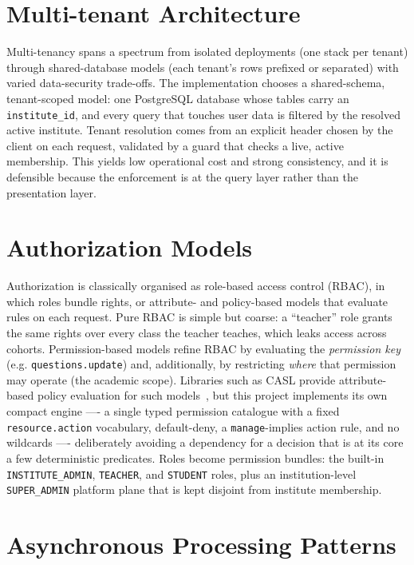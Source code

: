\section{Multi-tenant Architecture}

Multi-tenancy spans a spectrum from isolated deployments (one stack per
tenant) through shared-database models (each tenant's rows prefixed or
separated) with varied data-security trade-offs. The implementation chooses a
shared-schema, tenant-scoped model: one PostgreSQL database whose tables carry
an \texttt{institute\_id}, and every query that touches user data is filtered
by the resolved active institute. Tenant resolution comes from an explicit
header chosen by the client on each request, validated by a guard that checks
a live, active membership. This yields low operational cost and strong
consistency, and it is defensible because the enforcement is at the query
layer rather than the presentation layer.

\section{Authorization Models}

Authorization is classically organised as role-based access control (RBAC),
in which roles bundle rights, or attribute- and policy-based models that
evaluate rules on each request. Pure RBAC is simple but coarse: a ``teacher''
role grants the same rights over every class the teacher teaches, which leaks
access across cohorts. Permission-based models refine RBAC by evaluating the
\emph{permission key} (e.g. \texttt{questions.update}) and, additionally, by
restricting \emph{where} that permission may operate (the academic scope).
Libraries such as CASL provide attribute-based policy evaluation for such
models~\cite{casl}, but this project implements its own compact engine ---- a
single typed permission catalogue with a fixed \texttt{resource.action}
vocabulary, default-deny, a \texttt{manage}-implies action rule, and no
wildcards ---- deliberately avoiding a dependency for a decision that is at
its core a few deterministic predicates. Roles become permission bundles: the
built-in \texttt{INSTITUTE\_ADMIN}, \texttt{TEACHER}, and \texttt{STUDENT}
roles, plus an institution-level \texttt{SUPER\_ADMIN} platform plane that is
kept disjoint from institute membership.

\section{Asynchronous Processing Patterns}

